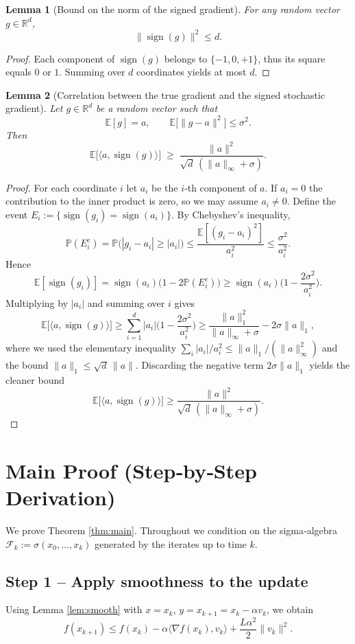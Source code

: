 \documentclass{article}
\newtheorem{lemma}{Lemma}
\newcommand{\sign}{\operatorname{sign}}
\newcommand{\E}{\mathbb{E}}
\newcommand{\R}{\mathbb{R}}
\begin{document}
\begin{lemma}[Bound on the norm of the signed gradient]\label{lem:signbound}
For any random vector $g\in\R^{d}$,
\[
\|\sign(g)\|^{2}\le d.
\]
\end{lemma}
\begin{proof}
Each component of $\sign(g)$ belongs to $\{-1,0,+1\}$, thus its square equals $0$ or $1$. Summing over $d$ coordinates yields at most $d$. \qedhere
\end{proof}

\begin{lemma}[Correlation between the true gradient and the signed stochastic gradient]\label{lem:signinner}
Let $g\in\R^{d}$ be a random vector such that
\[
\E[g]=a,\qquad \E\!\big[\|g-a\|^{2}\big]\le\sigma^{2}.
\]
Then
\[
\E\!\big[\langle a,\sign(g)\rangle\big]
\;\ge\;
\frac{\|a\|^{2}}{\sqrt{d}\,(\|a\|_{\infty}+ \sigma)}.
\tag{3}
\]
\end{lemma}
\begin{proof}
For each coordinate $i$ let $a_i$ be the $i$‑th component of $a$.
If $a_i=0$ the contribution to the inner product is zero, so we may assume $a_i\neq0$.
Define the event $E_i:=\{\sign(g_i)=\sign(a_i)\}$.
By Chebyshev’s inequality,
\[
\mathbb{P}(E_i^{c})=\mathbb{P}\big(|g_i-a_i|\ge |a_i|\big)
\le\frac{\E[(g_i-a_i)^{2}]}{a_i^{2}}
\le\frac{\sigma^{2}}{a_i^{2}} .
\]
Hence
\[
\E[\sign(g_i)] = \sign(a_i)\big(1-2\mathbb{P}(E_i^{c})\big)
\ge \sign(a_i)\Big(1-\frac{2\sigma^{2}}{a_i^{2}}\Big).
\]
Multiplying by $|a_i|$ and summing over $i$ gives
\[
\E\!\big[\langle a,\sign(g)\rangle\big]
\ge \sum_{i=1}^{d}|a_i|
      \Big(1-\frac{2\sigma^{2}}{a_i^{2}}\Big)
\ge \frac{\|a\|_{1}^{2}}{\|a\|_{\infty}+ \sigma}
      -2\sigma\|a\|_{1},
\]
where we used the elementary inequality
$\displaystyle\sum_i|a_i|/a_i^{2}\le \|a\|_{1}/(\|a\|_{\infty}^{2})$ and the bound
$\|a\|_{1}\le\sqrt{d}\,\|a\|$.
Discarding the negative term $2\sigma\|a\|_{1}$ yields the cleaner bound
\[
\E\!\big[\langle a,\sign(g)\rangle\big]
\ge \frac{\|a\|^{2}}{\sqrt{d}\,(\|a\|_{\infty}+ \sigma)} .
\]
\end{proof}

\section*{Main Proof (Step‑by‑Step Derivation)}
We prove Theorem \ref{thm:main}. Throughout we condition on the sigma‑algebra
$\mathcal{F}_k:=\sigma(x_0,\dots,x_k)$ generated by the iterates up to time $k$.

\subsection*{Step 1 – Apply smoothness to the update}
Using Lemma \ref{lem:smooth} with $x=x_k$, $y=x_{k+1}=x_k-\alpha v_k$, we obtain
\[
f(x_{k+1})\le f(x_k)-\alpha\langle\nabla f(x_k),v_k\rangle
               +\frac{L\alpha^{2}}{2}\|v_k\|^{2}.
\tag{4}
\]
\end{document}
